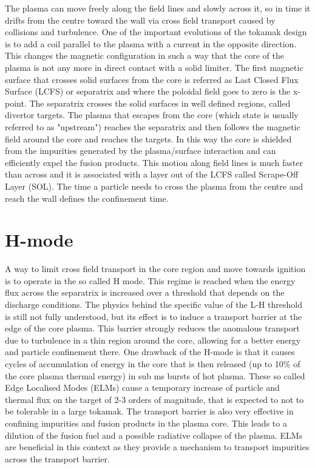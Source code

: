 The plasma can move freely along the field lines and slowly across it, so in time it drifts from the centre toward the wall via cross field transport caused by collisions and turbulence. One of the important evolutions of the tokamak design is to add a coil parallel to the plasma with a current in the opposite direction. This changes the magnetic configuration in such a way that the core of the plasma is not any more in direct contact with a solid limiter. The first magnetic surface that crosses solid surfaces from the core is referred as Last Closed Flux Surface (LCFS) or separatrix and where the poloidal field goes to zero is the x-point. The separatrix crosses the solid surfaces in well defined regions, called divertor targets. The plasma that escapes from the core (which state is usually referred to as "upstream") reaches the separatrix and then follows the magnetic field around the core and reaches the targets. In this way the core is shielded from the impurities generated by the plasma/surface interaction and can efficiently expel the fusion products. This motion along field lines is much faster than across and it is associated with a layer out of the LCFS called Scrape-Off Layer (SOL). The time a particle needs to cross the plasma from the centre and reach the wall defines the confinement time.

\section{H-mode}
A way to limit cross field transport in the core region and move towards ignition is to operate in the so called H mode. This regime is reached when the energy flux across the separatrix is increased over a threshold that depends on the discharge conditions.\cite{Ryter1998} The physics behind the specific value of the L-H threshold is still not fully understood, but its effect is to induce a transport barrier at the edge of the core plasma. This barrier strongly reduces the anomalous transport due to turbulence in a thin region around the core, allowing for a better energy and particle confinement there. One drawback of the H-mode is that it causes cycles of accumulation of energy in the core that is then released (up to 10\% of the core plasma thermal energy\cite{Zohm1996}) in sub ms bursts of hot plasma. These so called Edge Localised Modes (ELMs) cause a temporary increase of particle and thermal flux on the target of 2-3 orders of magnitude, that is expected to not to be tolerable in a large tokamak.\cite{Jachmich2011} The transport barrier is also very effective in confining impurities and fusion products in the plasma core.\cite{Putterich2011} This leads to a dilution of the fusion fuel and a possible radiative collapse of the plasma. ELMs are beneficial in this context as they provide a mechanism to transport impurities across the transport barrier.\cite{Leonard2014}

